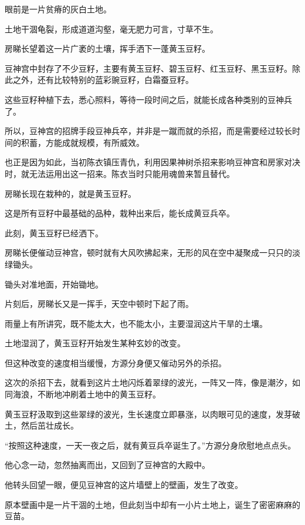 
\begin{this_body}

眼前是一片贫瘠的灰白土地。

土地干涸龟裂，形成道道沟壑，毫无肥力可言，寸草不生。

房睇长望着这一片广袤的土壤，挥手洒下一蓬黄玉豆籽。

豆神宫中封存了不少豆籽，主要有黄玉豆籽、碧玉豆籽、红玉豆籽、黑玉豆籽。除此之外，还有比较特别的蓝彩豌豆籽，白霜蚕豆籽。

这些豆籽种植下去，悉心照料，等待一段时间之后，就能长成各种类别的豆神兵了。

所以，豆神宫的招牌手段豆神兵卒，并非是一蹴而就的杀招，而是需要经过较长时间的积蓄，方能成就规模，有所威效。

也正是因为如此，当初陈衣镇压青仇，利用因果神树杀招来影响豆神宫和房家对决时，就无法运用出这一招来。陈衣当时只能用魂兽来暂且替代。

房睇长现在栽种的，就是黄玉豆籽。

这是所有豆籽中最基础的品种，栽种出来后，能长成黄豆兵卒。

此刻，黄玉豆籽已经洒下。

房睇长便催动豆神宫，顿时就有大风吹拂起来，无形的风在空中凝聚成一只只的淡绿锄头。

锄头对准地面，开始锄地。

片刻后，房睇长又是一挥手，天空中顿时下起了雨。

雨量上有所讲究，既不能太大，也不能太小，主要湿润这片干旱的土壤。

土地湿润了，黄玉豆籽开始发生某种玄妙的改变。

但这种改变的速度相当缓慢，方源分身便又催动另外的杀招。

这次的杀招下去，就看到这片土地闪烁着翠绿的波光，一阵又一阵，像是潮汐，如同海浪，不断地冲刷着土地中的黄玉豆籽。

黄玉豆籽汲取到这些翠绿的波光，生长速度立即暴涨，以肉眼可见的速度，发芽破土，然后茁壮成长。

“按照这种速度，一天一夜之后，就有黄豆兵卒诞生了。”方源分身欣慰地点点头。

他心念一动，忽然抽离而出，又回到了豆神宫的大殿中。

他转头回望一眼，便见豆神宫的这片墙壁上的壁画，发生了改变。

原本壁画中是一片干涸的土地，但此刻当中却有一小片土地上，诞生了密密麻麻的豆苗。


\end{this_body}
